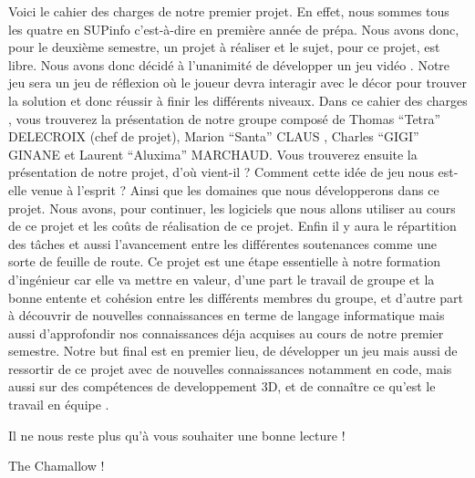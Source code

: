 \documentclass[a4paper]{article}
\begin{document}
    Voici le cahier des charges de notre premier projet. En effet, nous sommes tous les quatre en SUPinfo c’est-à-dire en première année de prépa. Nous avons donc, pour le deuxième semestre, un projet à réaliser et le sujet, pour ce projet, est libre.
Nous avons donc décidé à l’unanimité de développer un jeu vidéo .
Notre jeu sera un jeu de réflexion où le joueur devra interagir avec le décor pour trouver la solution et donc réussir à finir les différents niveaux.
Dans ce cahier des charges , vous trouverez la présentation de notre groupe composé de Thomas “Tetra” DELECROIX (chef de projet), Marion “Santa” CLAUS , Charles “GIGI” GINANE et Laurent “Aluxima” MARCHAUD.
Vous trouverez ensuite la présentation de notre projet, d’où vient-il ? Comment cette idée de jeu nous est-elle venue à l’esprit ? Ainsi que les domaines que nous développerons dans ce projet.
Nous avons, pour continuer, les logiciels que nous allons utiliser au cours de ce projet et les coûts de réalisation de ce projet.
Enfin il y aura le répartition des tâches et aussi l’avancement entre les différentes soutenances comme une sorte de feuille de route.
Ce projet est une étape essentielle à notre formation d’ingénieur car elle va mettre en valeur, d’une part le travail de groupe et la bonne entente et cohésion entre les différents membres du groupe, et d’autre part à découvrir de nouvelles connaissances en terme de langage informatique mais aussi d’approfondir nos connaissances déja acquises au cours de notre premier semestre.
Notre but final est en premier lieu, de développer un jeu mais aussi de ressortir de ce projet avec de nouvelles connaissances notamment en code, mais aussi sur des compétences de developpement 3D, et de connaître ce qu’est le travail en équipe .

\begin{flushleft}
Il ne nous reste plus qu’à vous souhaiter une bonne lecture !
\end{flushleft}


\quad
\begin {centering}

The Chamallow !

\end{centering}
\end{document}
